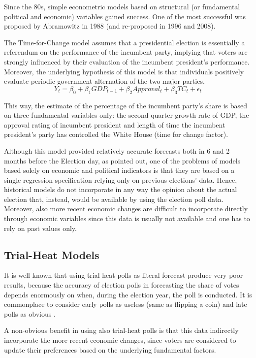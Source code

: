 \documentclass[
  12pt]{article}
\begin{document}
Since the 80s, simple econometric models based on structural (or
fundamental political and economic) variables gained success. One of the
most successful was proposed by Abramowitz in 1988 (and re-proposed in
1996 and 2008).

The Time-for-Change model \citep{abr:2008} assumes that a presidential
election is essentially a referendum on the performance of the incumbent
party, implying that voters are strongly influenced by their evaluation
of the incumbent president's performance. Moreover, the underlying
hypothesis of this model is that individuals positively evaluate
periodic government alternation of the two major parties.
\[Y_t = \beta_0 + \beta_1 GDP_{t-1} + \beta_2 Approval_t + \beta_3 TC_t + \epsilon_t\]

This way, the estimate of the percentage of the incumbent party's share
is based on three fundamental variables only: the second quarter growth
rate of GDP, the approval rating of incumbent president and length of
time the incumbent president's party has controlled the White House
(time for change factor).

Although this model provided relatively accurate forecasts both in 6 and
2 months before the Election day, as \citet{gel:kin:1993} pointed out,
one of the problems of models based solely on economic and political
indicators is that they are based on a single regression specification
relying only on previous elections' data. Hence, historical models do
not incorporate in any way the opinion about the actual election that,
instead, would be available by using the election poll data. Moreover,
also more recent economic changes are difficult to incorporate directly
through economic variables since this data is usually not available and
one has to rely on past values only.

\hypertarget{trial-heat-models}{%
\subsection{Trial-Heat Models}\label{trial-heat-models}}

It is well-known that using trial-heat polls as literal forecast produce
very poor results, because the accuracy of election polls in forecasting
the share of votes depends enormously on when, during the election year,
the poll is conducted. It is commonplace to consider early polls as
useless (same as flipping a coin) and late polls as obvious
\citep{cam:1996}.

A non-obvious benefit in using also trial-heat polls is that this data
indirectly incorporate the more recent economic changes, since voters
are considered to update their preferences based on the underlying
fundamental factors.
\end{document}
